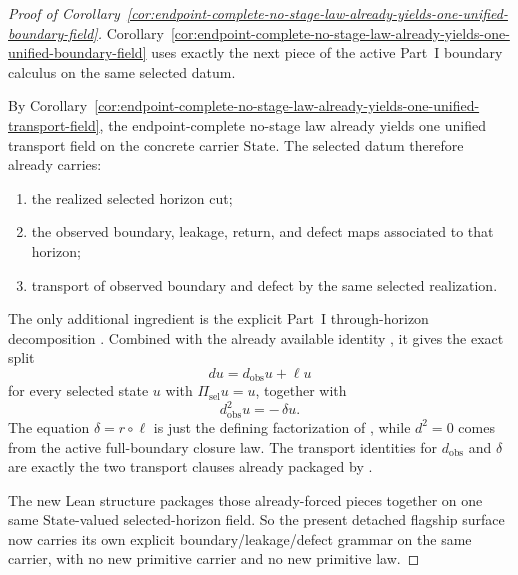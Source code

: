 \begin{proof}[Proof of Corollary~\ref{cor:endpoint-complete-no-stage-law-already-yields-one-unified-boundary-field}]
\label{proof:cor:endpoint-complete-no-stage-law-already-yields-one-unified-boundary-field}
Corollary~\ref{cor:endpoint-complete-no-stage-law-already-yields-one-unified-boundary-field}
uses exactly the next piece of the active Part~I boundary calculus on the same
selected datum.

By Corollary~\ref{cor:endpoint-complete-no-stage-law-already-yields-one-unified-transport-field},
the endpoint-complete no-stage law already yields one unified transport field
on the concrete carrier \(\mathrm{State}\). The selected datum therefore
already carries:
\begin{enumerate}[label=(\roman*), leftmargin=2em, itemsep=0.2em]
\item the realized selected horizon cut;
\item the observed boundary, leakage, return, and defect maps associated to
      that horizon;
\item transport of observed boundary and defect by the same selected
      realization.
\end{enumerate}

The only additional ingredient is the explicit Part~I through-horizon
decomposition . Combined with the already
available identity
, it gives the exact split
\[
d u = d_{\mathrm{obs}}u + \ell u
\]
for every selected state \(u\) with \(\Pi_{\mathrm{sel}}u = u\), together with
\[
d_{\mathrm{obs}}^2 u = -\,\delta u.
\]
The equation \(\delta = r \circ \ell\) is just the defining factorization of
, while \(d^2=0\) comes from the active full-boundary
closure law. The transport identities for \(d_{\mathrm{obs}}\) and \(\delta\)
are exactly the two transport clauses already packaged by
.

The new Lean structure  packages
those already-forced pieces together on one same \(\mathrm{State}\)-valued
selected-horizon field. So the present detached flagship surface now carries
its own explicit boundary/leakage/defect grammar on the same carrier, with no
new primitive carrier and no new primitive law.
\end{proof}


